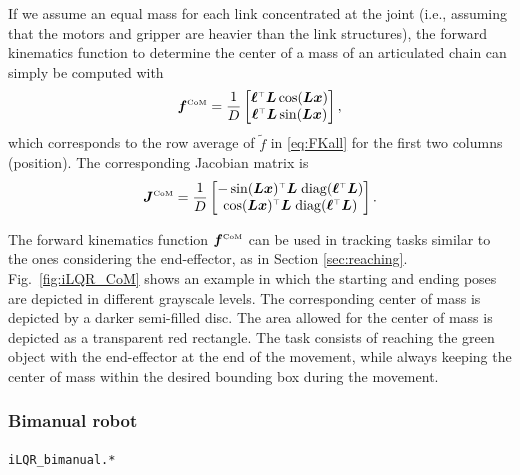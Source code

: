 \documentclass[10pt,a4paper]{article} %
\newcommand{\trsp}{{\scriptscriptstyle\top}}
\newcommand{\tp}[1]{\text{\tiny#1}}
\newcommand{\diag}{\mathrm{diag}}
\newcommand{\filename}[1]{\colorbox{rr2}{\color{white}\texttt{#1}}}
\begin{document}
If we assume an equal mass for each link concentrated at the joint (i.e., assuming that the motors and gripper are heavier than the link structures), the forward kinematics function to determine the center of a mass of an articulated chain can simply be computed with
\begin{equation*}
	\bm{f}^\tp{CoM} = \frac{1}{D}\begin{bmatrix} \bm{\ell}^\trsp \bm{L} \cos(\bm{L}\bm{x}) \\ \bm{\ell}^\trsp \bm{L} \sin(\bm{L}\bm{x}) \end{bmatrix},
\end{equation*}
which corresponds to the row average of $\tilde{f}$ in \eqref{eq:FKall} for the first two columns (position).	
The corresponding Jacobian matrix is
\begin{equation*}
	\bm{J}^\tp{CoM} = \frac{1}{D}\begin{bmatrix} 
	-\sin(\bm{L}\bm{x})^\trsp \bm{L} \; \diag(\bm{\ell}^\trsp \bm{L}) \\ 
	\cos(\bm{L}\bm{x})^\trsp \bm{L} \; \diag(\bm{\ell}^\trsp \bm{L})
	\end{bmatrix}.
\end{equation*}

The forward kinematics function $\bm{f}^\tp{CoM}$ can be used in tracking tasks similar to the ones considering the end-effector, as in Section \ref{sec:reaching}. Fig.~\ref{fig:iLQR_CoM} shows an example in which the starting and ending poses are depicted in different grayscale levels. The corresponding center of mass is depicted by a darker semi-filled disc. The area allowed for the center of mass is depicted as a transparent red rectangle. The task consists of reaching the green object with the end-effector at the end of the movement, while always keeping the center of mass within the desired bounding box during the movement.



\subsubsection{Bimanual robot}
\begin{flushright}
\filename{iLQR\_bimanual.*}
\end{flushright}
\end{document}
